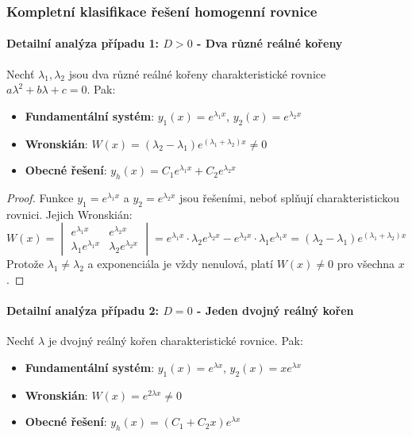 \subsubsection{Kompletní klasifikace řešení homogenní rovnice}
\label{subsubsec:klasifikace-reseni}

\paragraph{Detailní analýza případu 1: $D > 0$ - Dva různé reálné kořeny}

\begin{theorem}
Nechť $\lambda_1, \lambda_2$ jsou dva různé reálné kořeny charakteristické rovnice $a\lambda^2 + b\lambda + c = 0$. Pak:
\begin{itemize}
\item \textbf{Fundamentální systém}: $y_1(x) = e^{\lambda_1 x}$, $y_2(x) = e^{\lambda_2 x}$
\item \textbf{Wronskián}: $W(x) = (\lambda_2 - \lambda_1)e^{(\lambda_1 + \lambda_2)x} \neq 0$
\item \textbf{Obecné řešení}: $y_h(x) = C_1 e^{\lambda_1 x} + C_2 e^{\lambda_2 x}$
\end{itemize}
\end{theorem}

\begin{proof}
Funkce $y_1 = e^{\lambda_1 x}$ a $y_2 = e^{\lambda_2 x}$ jsou řešeními, neboť splňují charakteristickou rovnici. Jejich Wronskián:
\[
W(x) = \begin{vmatrix}
e^{\lambda_1 x} & e^{\lambda_2 x} \\
\lambda_1 e^{\lambda_1 x} & \lambda_2 e^{\lambda_2 x}
\end{vmatrix} = e^{\lambda_1 x} \cdot \lambda_2 e^{\lambda_2 x} - e^{\lambda_2 x} \cdot \lambda_1 e^{\lambda_1 x} = (\lambda_2 - \lambda_1)e^{(\lambda_1 + \lambda_2)x}
\]
Protože $\lambda_1 \neq \lambda_2$ a exponenciála je vždy nenulová, platí $W(x) \neq 0$ pro všechna $x$.
\end{proof}

\paragraph{Detailní analýza případu 2: $D = 0$ - Jeden dvojný reálný kořen}

\begin{theorem}[Řešení pro $D = 0$]
Nechť $\lambda$ je dvojný reálný kořen charakteristické rovnice. Pak:
\begin{itemize}
\item \textbf{Fundamentální systém}: $y_1(x) = e^{\lambda x}$, $y_2(x) = xe^{\lambda x}$
\item \textbf{Wronskián}: $W(x) = e^{2\lambda x} \neq 0$
\item \textbf{Obecné řešení}: $y_h(x) = (C_1 + C_2 x)e^{\lambda x}$
\end{itemize}
\end{theorem}

